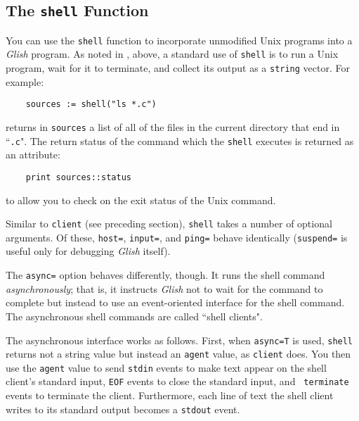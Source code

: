\subsection{The {\tt shell} Function}
\label{async-shell}

You can use the {\tt shell} function to incorporate unmodified {\sc Unix}
programs into a {\em Glish} program.  As noted in , above,
a standard use of {\tt shell} is to run a {\sc Unix} program, wait for
it to terminate, and collect its output as a {\tt string} vector.  For
example:
\begin{verbatim}
    sources := shell("ls *.c")
\end{verbatim}
returns in {\tt sources} a list of all of the files in the current
directory that end in ``{\tt .c}". The return status of the command which
the {\tt shell} executes is returned as an attribute:
\begin{verbatim}
    print sources::status
\end{verbatim}
to allow you to check on the exit status of the {\sc Unix} command.

Similar to {\tt client} (see preceding section),
{\tt shell} takes a number of optional arguments.  Of these, {\tt host=},
{\tt input=}, and {\tt ping=} behave identically ({\tt suspend=} is useful
only for debugging {\em Glish} itself).

The {\tt async=} option behaves differently, though.  It runs the
shell command {\em asynchronously\/}; that is, it instructs {\em
Glish} 
not to wait for the command to complete but instead to use an event-oriented
interface for the shell command.  The  asynchronous shell commands are
called ``shell clients".

The asynchronous interface works as follows.  First, when {\tt async=T}
is used, {\tt shell} returns not a string value but instead an {\tt agent}
value, as {\tt client} does.  You then use the {\tt agent}
value to send {\tt stdin} events to make text appear on the shell client's
standard input, {\tt EOF} events to close the standard input, and {\tt
terminate} events to terminate the client.  Furthermore, each line of text
the shell client writes to its standard output becomes a {\tt stdout}
event.


